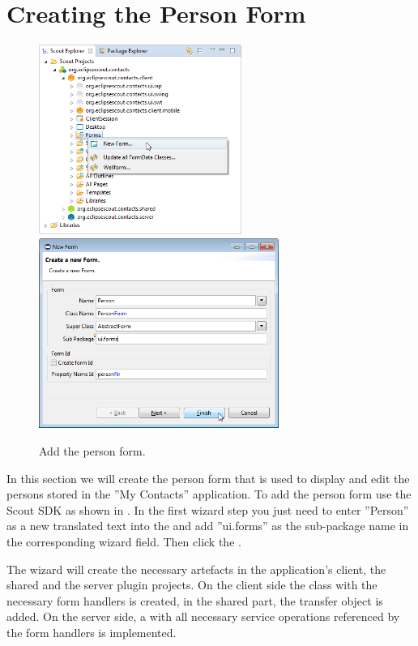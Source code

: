 \documentclass[a4paper,10pt,twoside]{book}
\begin{document}
\section{Creating the Person Form}

\begin{figure}
\includegraphics[height=6.2cm]{new_form_person_contextmenu.png} \hspace{5mm}
\includegraphics[height=6.2cm]{new_form_person.png}
\caption{Add the person form.}
\end{figure}

In this section we will create the person form that is used to display and edit the persons stored in the ''My Contacts'' application. 
To add the person form use the Scout SDK  as shown in . 
In the first wizard step you just need to enter ''Person'' as a new translated text into the  and add ''ui.forms'' as the sub-package name in the corresponding wizard field. 
Then click the .

The wizard will create the necessary artefacts in the application's client, the shared and the server plugin projects. 
On the client side the  class with the necessary form handlers is created, in the shared part, the  transfer object is added. 
On the server side, a  with all necessary service operations referenced by the form handlers is implemented. 
\end{document}
